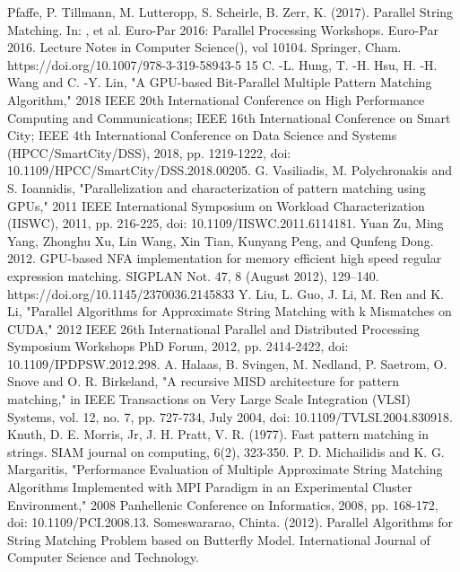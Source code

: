 \documentclass[11pt]{article}       %
\begin{document}
\begin{thebibliography}{99}  
Pfaffe, P. Tillmann, M. Lutteropp, S. Scheirle, B. Zerr, K. (2017). Parallel String Matching. In: , et al. Euro-Par 2016: Parallel Processing Workshops. Euro-Par 2016. Lecture Notes in Computer Science(), vol 10104. Springer, Cham. {https://doi.org/10.1007/978-3-319-58943-5 15}
C. -L. Hung, T. -H. Hsu, H. -H. Wang and C. -Y. Lin, "A GPU-based Bit-Parallel Multiple Pattern Matching Algorithm," 2018 IEEE 20th International Conference on High Performance Computing and Communications; IEEE 16th International Conference on Smart City; IEEE 4th International Conference on Data Science and Systems (HPCC/SmartCity/DSS), 2018, pp. 1219-1222, doi: 10.1109/HPCC/SmartCity/DSS.2018.00205.
G. Vasiliadis, M. Polychronakis and S. Ioannidis, "Parallelization and characterization of pattern matching using GPUs," 2011 IEEE International Symposium on Workload Characterization (IISWC), 2011, pp. 216-225, doi: 10.1109/IISWC.2011.6114181.
Yuan Zu, Ming Yang, Zhonghu Xu, Lin Wang, Xin Tian, Kunyang Peng, and Qunfeng Dong. 2012. GPU-based NFA implementation for memory efficient high speed regular expression matching. SIGPLAN Not. 47, 8 (August 2012), 129–140. https://doi.org/10.1145/2370036.2145833
Y. Liu, L. Guo, J. Li, M. Ren and K. Li, "Parallel Algorithms for Approximate String Matching with k Mismatches on CUDA," 2012 IEEE 26th International Parallel and Distributed Processing Symposium Workshops PhD Forum, 2012, pp. 2414-2422, doi: 10.1109/IPDPSW.2012.298.
A. Halaas, B. Svingen, M. Nedland, P. Saetrom, O. Snove and O. R. Birkeland, "A recursive MISD architecture for pattern matching," in IEEE Transactions on Very Large Scale Integration (VLSI) Systems, vol. 12, no. 7, pp. 727-734, July 2004, doi: 10.1109/TVLSI.2004.830918.
Knuth, D. E. Morris, Jr, J. H. Pratt, V. R. (1977). Fast pattern matching in strings. SIAM journal on computing, 6(2), 323-350.
P. D. Michailidis and K. G. Margaritis, "Performance Evaluation of Multiple Approximate String Matching Algorithms Implemented with MPI Paradigm in an Experimental Cluster Environment," 2008 Panhellenic Conference on Informatics, 2008, pp. 168-172, doi: 10.1109/PCI.2008.13.
Someswararao, Chinta. (2012). Parallel Algorithms for String Matching Problem based on Butterfly Model. International Journal of Computer Science and Technology. 

\end{thebibliography}
\end{document}
